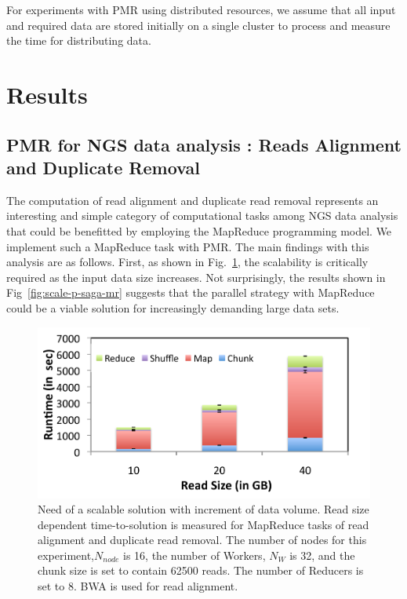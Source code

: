 \documentclass{acm_proc_article-sp}
\begin{document}
 
For experiments with PMR using distributed resources, we assume that
all input and required data are stored initially on a single cluster
to process and measure the time for distributing data.

\section{Results}\label{sec:results}

\subsection{PMR for NGS data analysis : Reads Alignment and Duplicate
  Removal}

The computation of read alignment and duplicate read removal represents an
interesting and simple category of computational tasks among NGS data
analysis that could be benefitted by employing the MapReduce
programming model.  We implement such a MapReduce task with PMR.  The
main findings with this analysis are as follows.  First, as shown in
Fig.~\ref{fig:read-size}, the scalability is critically required as
the input data size increases.  Not surprisingly, the results shown in
Fig~\ref{fig:scale-p-saga-mr} suggests that the parallel strategy with
MapReduce could be a viable solution for increasingly demanding large
data sets.

 \begin{figure}
 \centering
\includegraphics[scale=0.50]{figures/pj-smr-tts.pdf} 
\caption{\small Need of a scalable solution with increment of data volume.  Read size dependent time-to-solution is measured for MapReduce tasks of read alignment and duplicate read removal.  The number of nodes for this experiment,$N_{node}$ is 16, the number of Workers, $N_W$ is 32, and the chunk size is set to contain 62500 reads.  The number of Reducers is set to 8. BWA is used for read alignment.}
  \label{fig:read-size} 
\end{figure}
\end{document}
